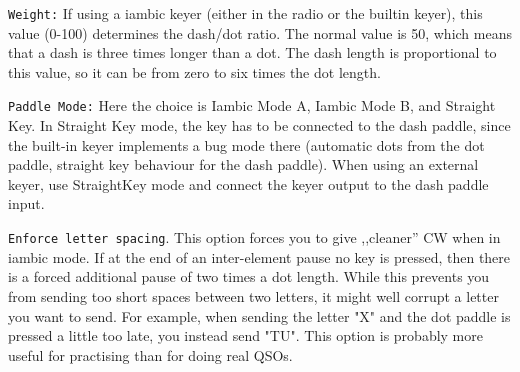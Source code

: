 \documentclass[12pt]{book}
\def\rett#1{\texttt{\color{red}#1}}
\def\pH{pi\-HPSDR\xspace}
\begin{document}
\rett{Weight:} If using a iambic keyer (either in the radio or
the builtin keyer), this value (0-100) determines the dash/dot ratio.
The normal value is 50, which means that a dash is three times longer
than a dot. The dash length is proportional to this value, so it can
be from zero to six times the dot length.

%

\rett{Paddle Mode:} Here the choice is Iambic Mode A, Iambic Mode B,
and  Straight Key. In Straight Key mode, the key has to be connected
to the dash paddle, since the built-in keyer implements a bug mode
there (automatic dots from the dot paddle, straight key behaviour
for the dash paddle). When using an external keyer, use StraightKey
mode and connect the keyer output to the dash paddle input.

\rett{Enforce letter spacing}. This option forces you to give ,,cleaner'' CW
when in iambic mode. If at the end of an inter-element pause no key is
pressed, then there is a forced additional pause of two times a dot length. While this
prevents you from sending too short spaces between two letters, it
might well corrupt a letter you want to send. For example, when sending
the letter "X" and the dot paddle is pressed a little too late, you
instead send "TU". This option is probably more useful for practising than
for doing real QSOs.
\end{document}

